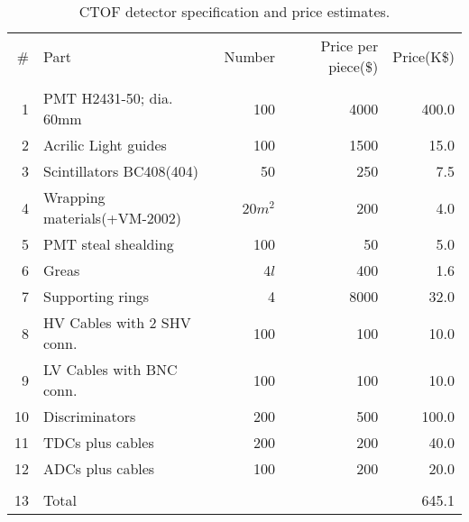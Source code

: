 \begin{table}[htbp]
\begin{center}
\begin{tabular}{|r|l|r|r|r|} \hline
\# &Part 		    & Number      	        & Price per piece(\$)& Price(K\$)     \\
 &  		            &                   &                     &                \\ \hline
1&PMT H2431-50; dia. 60mm   & 100 		& 4000 		      &    400.0       \\ \hline
2&Acrilic Light guides	    & 100 		& 1500		      &     15.0       \\ \hline
3&Scintillators BC408(404)     & 50             &  250                &      7.5       \\ \hline
4&Wrapping materials(+VM-2002) & 20$m^2$        &  200                &      4.0       \\ \hline  
5&PMT steal       shealding    & 100           	&   50                &      5.0       \\ \hline
6&Greas 	    & 4$l$ 		        & 400		      &      1.6       \\ \hline
7&Supporting rings  & 4                         & 8000                &     32.0       \\ \hline
8&HV Cables with 2 SHV conn.& 100               & 100                 &     10.0       \\ \hline
9&LV Cables with BNC conn.  & 100               & 100                 &     10.0       \\ \hline
10&Discriminators           & 200               & 500                 &    100.0       \\ \hline 
11&TDCs plus cables         & 200               & 200                 &     40.0       \\ \hline
12&ADCs plus cables         & 100               & 200                 &     20.0       \\ \hline
  &                         &                   &                     &                \\ \hline
13&        Total            &                   &                     &    645.1       \\ \hline
\end{tabular}
\caption{CTOF detector specification and  price estimates.\label{spec}}
\end{center}
\end{table}
